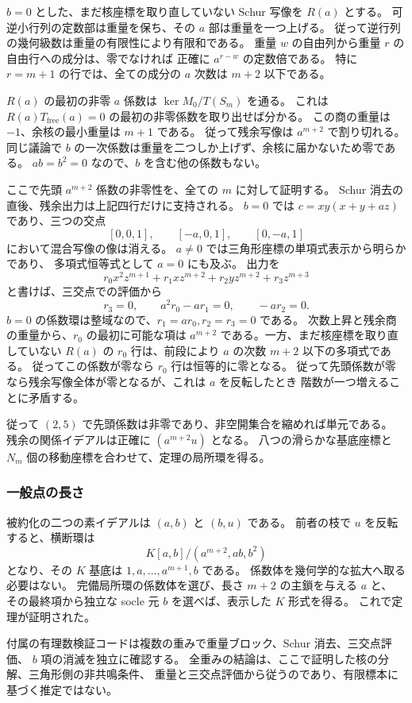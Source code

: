 $b=0$ とした、まだ核座標を取り直していない Schur 写像を $R(a)$ とする。
可逆小行列の定数部は重量を保ち、その $a$ 部は重量を一つ上げる。
従って逆行列の幾何級数は重量の有限性により有限和である。
重量 $w$ の自由列から重量 $r$ の自由行への成分は、零でなければ
正確に $a^{r-w}$ の定数倍である。
特に $r=m+1$ の行では、全ての成分の $a$ 次数は $m+2$ 以下である。

$R(a)$ の最初の非零 $a$ 係数は
$\ker M_0/T(S_m)$ を通る。
これは $R(a)T_{\mathrm{free}}(a)=0$ の最初の非零係数を取り出せば分かる。
この商の重量は $-1$、余核の最小重量は $m+1$ である。
従って残余写像は $a^{m+2}$ で割り切れる。
同じ議論で $b$ の一次係数は重量を二つしか上げず、余核に届かないため零である。
$ab=b^2=0$ なので、$b$ を含む他の係数もない。

ここで先頭 $a^{m+2}$ 係数の非零性を、全ての $m$ に対して証明する。
Schur 消去の直後、残余出力は上記四行だけに支持される。
$b=0$ では $c=xy(x+y+az)$ であり、三つの交点
\[
 [0,0,1],\qquad[-a,0,1],\qquad[0,-a,1]
\]
において混合写像の像は消える。
$a\ne0$ では三角形座標の単項式表示から明らかであり、
多項式恒等式として $a=0$ にも及ぶ。
出力を
\[
 r_0x^2z^{m+1}+r_1xz^{m+2}+r_2yz^{m+2}+r_3z^{m+3}
\]
と書けば、三交点での評価から
\[
 r_3=0,\qquad a^2r_0-ar_1=0,\qquad-ar_2=0.
\]
$b=0$ の係数環は整域なので、$r_1=ar_0,r_2=r_3=0$ である。
次数上昇と残余商の重量から、$r_0$ の最初に可能な項は
$a^{m+2}$ である。一方、まだ核座標を取り直していない $R(a)$ の
$r_0$ 行は、前段により $a$ の次数 $m+2$ 以下の多項式である。
従ってこの係数が零なら $r_0$ 行は恒等的に零となる。
従って先頭係数が零なら残余写像全体が零となるが、これは $a$ を反転したとき
階数が一つ増えることに矛盾する。

従って $(2,5)$ で先頭係数は非零であり、非空開集合を縮めれば単元である。
残余の関係イデアルは正確に $(a^{m+2}u)$ となる。
八つの滑らかな基底座標と $N_m$ 個の移動座標を合わせて、定理の局所環を得る。

\subsubsection*{一般点の長さ}

被約化の二つの素イデアルは $(a,b)$ と $(b,u)$ である。
前者の枝で $u$ を反転すると、横断環は
\[
 K[a,b]/(a^{m+2},ab,b^2)
\]
となり、その $K$ 基底は $1,a,\ldots,a^{m+1},b$ である。
係数体を幾何学的な拡大へ取る必要はない。
完備局所環の係数体を選び、長さ $m+2$ の主鎖を与える $a$ と、
その最終項から独立な socle 元 $b$ を選べば、表示した $K$ 形式を得る。
これで定理が証明された。

\begin{remark}[計算による確認の役割]
付属の有理数検証コードは複数の重みで重量ブロック、Schur 消去、三交点評価、
$b$ 項の消滅を独立に確認する。
全重みの結論は、ここで証明した核の分解、三角形側の非共鳴条件、
重量と三交点評価から従うのであり、有限標本に基づく推定ではない。
\end{remark}

